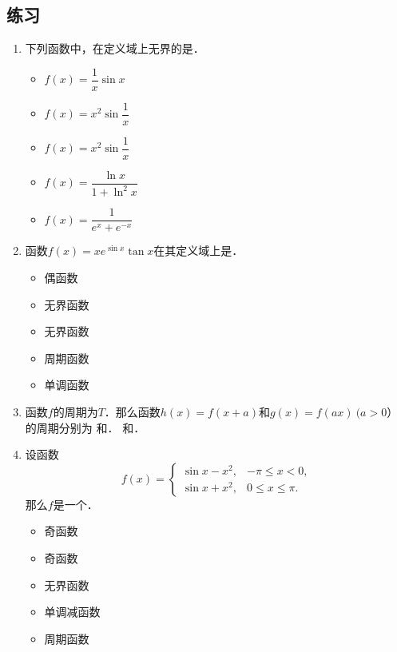 \ifshowex
{}
\subsection*{练习}

\begin{enumerate}
\item 下列函数中，在定义域上无界的是\uline{\makebox[4em]{}}．
  \begin{itemize}
    \renewcommand{\labelitemi}{\faCircleThin}
  \item \(f(x) = \dfrac1x \sin x\)
    \ifshowsol
    \item[\faCircle] \(f(x) = x^2 \sin \dfrac1x\)
    \else
    \item \(f(x) = x^2 \sin \dfrac1x\)
    \fi
  \item \(f(x) = \dfrac{\ln x}{1 + \ln^2 x}\)
  \item \(f(x) = \dfrac1{e^x + e^{-x}}\)
  \end{itemize}

\item 函数\(f(x) = x e^{\sin x} \tan x\)在其定义域上是\uline{\makebox[3em]{}}．
  \begin{itemize}
    \renewcommand{\labelitemi}{\faCircleThin}
  \item 偶函数
    \ifshowsol
    \item[\faCircle] 无界函数
    \else
    \item 无界函数
    \fi
  \item 周期函数
  \item 单调函数
  \end{itemize}

\item 函数\(f\)的周期为\(T\)．那么函数\(h(x) = f(x+a)\)和\(g(x) = f(ax)\ (a > 0）\)的周期分别为
  \ifshowsol
    \uline{}和\uline{}．
  \else
    \uline{\makebox[3em]{}}和\uline{\makebox[3em]{}}．
  \fi

\item 设函数
  \[
    f(x) =
    \begin{cases}
      \sin x - x^2, & -\pi \le x < 0, \\
      \sin x + x^2, & 0 \le x \le \pi.
    \end{cases}
  \]
  那么\(f\)是一个\uline{\makebox[4em]{}}．
  \begin{itemize}
    \renewcommand{\labelitemi}{\faCircleThin}
    \ifshowsol
    \item[\faCircle] 奇函数
    \else
    \item 奇函数
    \fi
  \item 无界函数
  \item 单调减函数
  \item 周期函数
  \end{itemize}


\end{enumerate}
